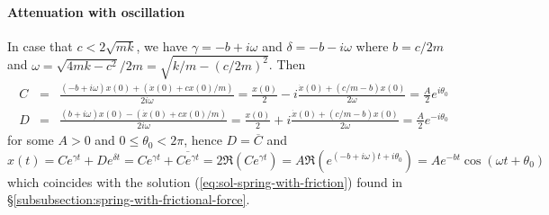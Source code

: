 \documentclass{article}
\begin{document}
\paragraph{Attenuation with oscillation}

In case that $c < 2\sqrt{mk}$,
we have $\gamma=-b +  i \omega$ and $\delta = -b - i \omega$
where
$
b= {c}/ {2m}
$
and
$
\omega
= {\sqrt{4mk-c^2}}/ {2m}
= \sqrt{k/m - (c/2m)^2}$.
Then
\begin{eqnarray*}
C &=&
\frac{
(-b+i\omega) x(0) +(\dot{x}(0) + cx(0)/m)
}{
2i\omega
}
= \frac{x(0)}{2}
- i\frac{\dot{x}(0) + (c/m-b)x(0)}{2\omega}
=\frac{A}{2} e^{ i \theta_0}
\\
D &=&
\frac{
(b+i\omega) x(0) - (\dot{x}(0) + cx(0)/m)
}{
2i\omega
}
=
\frac{x(0)}{2}
+
i
\frac{
\dot{x}(0) + (c/m-b)x(0)
}{
2\omega
}
=\frac{A}{2} e^{- i \theta_0}
\end{eqnarray*}
for some $A>0$ and $0\leq \theta_0 < 2\pi$,
hence $D = \overline{C}$ and
\[
x(t)
= C e^{\gamma t} + D e^{\delta t}
= C e^{\gamma t} + \overline{C e^{\gamma t}}
=  2 \Re (C e^{\gamma t} )
=  A \Re (e^{(-b+i\omega) t+i\theta_0} )
= A  e^{-bt} \cos(\omega t + \theta_0)
\]
which coincides with the solution (\ref{eq:sol-spring-with-friction}) found in \S\ref{subsubsection:spring-with-frictional-force}.



%
%
%
%
%
%

%

\end{document}
